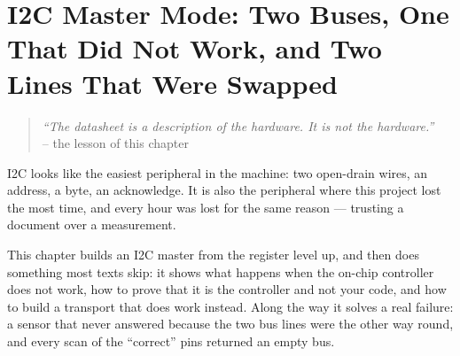 
\chapter[I2C Master Mode]{I2C Master Mode: Two Buses, One That Did Not Work, and Two Lines That Were Swapped}
\label{ch:chapter-07}

\begin{quote}
    \textit{``The datasheet is a description of the hardware. It is not the hardware.''}
    \\
    -- the lesson of this chapter
\end{quote}

I2C looks like the easiest peripheral in the machine: two open-drain wires, an address, a
byte, an acknowledge. It is also the peripheral where this project lost the most time, and
every hour was lost for the same reason — trusting a document over a measurement.

This chapter builds an I2C master from the register level up, and then does something most
texts skip: it shows what happens when the on-chip controller does not work, how to prove
that it is the controller and not your code, and how to build a transport that does work
instead. Along the way it solves a real failure: a sensor that never answered because the
two bus lines were the other way round, and every scan of the ``correct'' pins returned an
empty bus.

\minitoc

\clearpage










